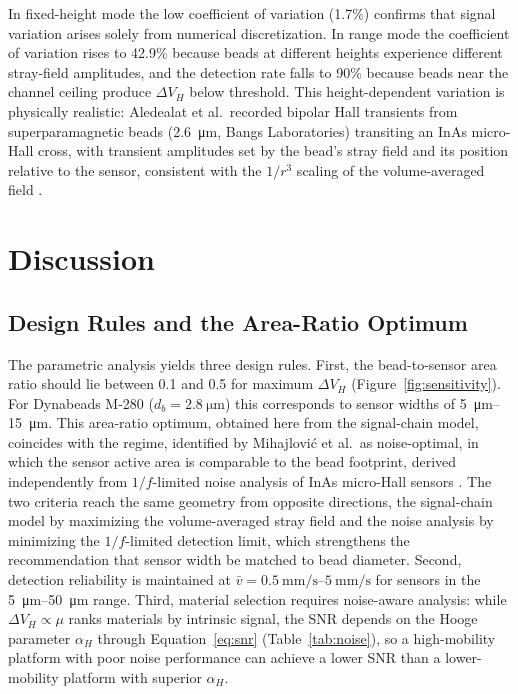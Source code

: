 \documentclass[micromachines,article,submit,pdftex,moreauthors]{Definitions/mdpi}
\begin{document}
In fixed-height mode the low coefficient of variation (1.7\%) confirms that signal
variation arises solely from numerical discretization. In range mode the coefficient
of variation rises to 42.9\% because beads at different heights experience different
stray-field amplitudes, and the detection rate falls to 90\% because beads near the
channel ceiling produce $\Delta V_H$ below threshold. This height-dependent variation
is physically realistic: Aledealat et al.\ recorded bipolar Hall transients from
superparamagnetic beads (\SI{2.6}{\micro\meter}, Bangs Laboratories) transiting an
InAs micro-Hall cross, with transient amplitudes set by the bead's stray field and
its position relative to the sensor, consistent with the $1/r^3$ scaling of the
volume-averaged field \cite{aledealat2009}.

\section{Discussion}
\label{sec:discussion}

\subsection{Design Rules and the Area-Ratio Optimum}

The parametric analysis yields three design rules. First, the bead-to-sensor area
ratio should lie between 0.1 and 0.5 for maximum $\Delta V_H$
(Figure~\ref{fig:sensitivity}). For Dynabeads M-280 ($d_b = \SI{2.8}{\micro\meter}$)
this corresponds to sensor widths of \SIrange{5}{15}{\micro\meter}. This area-ratio
optimum, obtained here from the signal-chain model, coincides with the regime,
identified by Mihajlovi\'{c} et al.\ as noise-optimal, in which the sensor active
area is comparable to the bead footprint, derived independently from
$1/f$-limited noise analysis of InAs micro-Hall sensors \cite{mihajlovic2007}. The two
criteria reach the same geometry from opposite directions, the signal-chain model by
maximizing the volume-averaged stray field and the noise analysis by minimizing the
$1/f$-limited detection limit, which strengthens the recommendation that sensor width
be matched to bead diameter. Second, detection reliability is maintained at
$\bar{v} = \SIrange{0.5}{5}{\milli\meter\per\second}$ for sensors in the
\SIrange{5}{50}{\micro\meter} range. Third, material selection requires noise-aware
analysis: while $\Delta V_H \propto \mu$ ranks materials by intrinsic signal, the SNR
depends on the Hooge parameter $\alpha_H$ through Equation~\eqref{eq:snr}
(Table~\ref{tab:noise}), so a high-mobility platform with poor noise performance can
achieve a lower SNR than a lower-mobility platform with superior $\alpha_H$.
\end{document}
